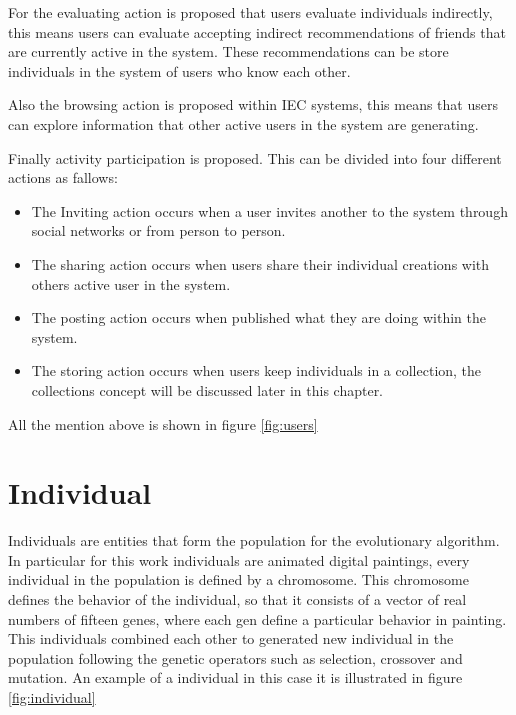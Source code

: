 For the evaluating action is proposed that users evaluate individuals
indirectly, this means users can evaluate accepting indirect recommendations of
friends that are currently active in the system. These recommendations can be
store individuals in the system of users who know each other.

Also the browsing action is proposed within IEC systems, this means that users
can explore information that other active users in the system are generating.

Finally activity participation is proposed. This can be divided into four
different actions as fallows:


\begin{itemize}
\item The Inviting action occurs when a user invites another to the system through social networks or from person to person.
\item The sharing action occurs when users share their individual creations with others active user in the system.
\item The posting action occurs when published what they are doing within the system.
\item The storing action occurs when users keep individuals in a collection, the collections concept will be discussed later in this chapter.
\end{itemize}

All the mention above is shown in figure \ref{fig:users}

\section{Individual}

Individuals are entities that form the population for the evolutionary
algorithm. In particular for this work individuals are animated digital
paintings, every individual in the population is defined by a chromosome.
This chromosome defines the behavior of the individual, so that it consists of a
vector of real numbers of fifteen genes, where each gen define a particular
behavior in painting. This individuals combined each other to generated new
individual in the population following the genetic operators such as selection,
crossover and mutation. An example of a individual in this case it is
illustrated in figure \ref{fig:individual}




